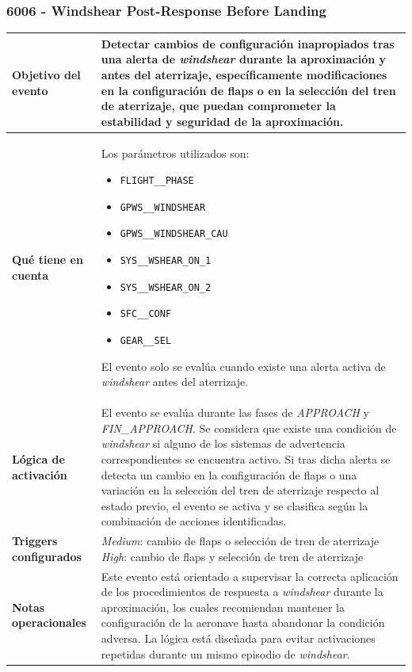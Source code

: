 \documentclass[11pt,a4paper]{article}
\begin{document}
	\subsubsection{6006 - Windshear Post-Response Before Landing}
	\begin{table}[H]
		\centering
		\renewcommand{\arraystretch}{1.3}
		\begin{tabular}{p{5cm} p{9.5cm}}
			\hline
			\textbf{Objetivo del evento} &
			Detectar cambios de configuración inapropiados tras una alerta de \textit{windshear} durante la aproximación y antes del aterrizaje, específicamente modificaciones en la configuración de flaps o en la selección del tren de aterrizaje, que puedan comprometer la estabilidad y seguridad de la aproximación. \\
			\hline
			\textbf{Qué tiene en cuenta} &
			Los parámetros utilizados son:
			\begin{itemize}
				\item \texttt{FLIGHT\_\_PHASE}
				\item \texttt{GPWS\_\_WINDSHEAR}
				\item \texttt{GPWS\_\_WINDSHEAR\_CAU}
				\item \texttt{SYS\_\_WSHEAR\_ON\_1}
				\item \texttt{SYS\_\_WSHEAR\_ON\_2}
				\item \texttt{SFC\_\_CONF}
				\item \texttt{GEAR\_\_SEL}
			\end{itemize}
			El evento solo se evalúa cuando existe una alerta activa de \textit{windshear} antes del aterrizaje. \\
			\hline
			\textbf{Lógica de activación} &
			El evento se evalúa durante las fases de \textit{APPROACH} y \textit{FIN\_APPROACH}.  
			Se considera que existe una condición de \textit{windshear} si alguno de los sistemas de advertencia correspondientes se encuentra activo.  
			Si tras dicha alerta se detecta un cambio en la configuración de flaps o una variación en la selección del tren de aterrizaje respecto al estado previo, el evento se activa y se clasifica según la combinación de acciones identificadas. \\
			\hline
			\textbf{Triggers configurados} &
			\textit{Medium}: cambio de flaps o selección de tren de aterrizaje \newline
			\textit{High}: cambio de flaps y selección de tren de aterrizaje \\
			\hline
			\textbf{Notas operacionales} &
			Este evento está orientado a supervisar la correcta aplicación de los procedimientos de respuesta a \textit{windshear} durante la aproximación, los cuales recomiendan mantener la configuración de la aeronave hasta abandonar la condición adversa.  
			La lógica está diseñada para evitar activaciones repetidas durante un mismo episodio de \textit{windshear}. \\
			\hline
		\end{tabular}
	\end{table}
	
\end{document}
